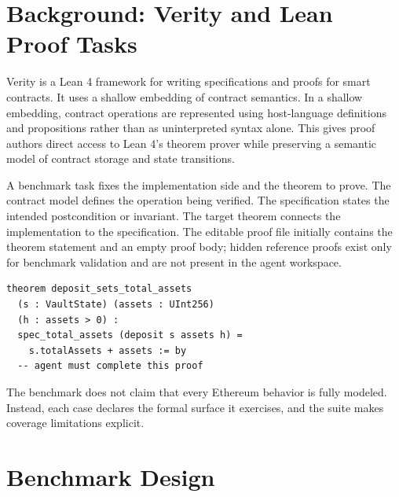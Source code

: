 \documentclass[conference]{IEEEtran}
\newcommand{\lean}{Lean 4}
\begin{document}
\section{Background: Verity and Lean Proof Tasks}

Verity is a \lean{} framework for writing specifications and proofs for smart
contracts. It uses a shallow embedding of contract semantics. In a shallow
embedding, contract operations are represented using host-language definitions
and propositions rather than as uninterpreted syntax alone. This gives proof
authors direct access to \lean{}'s theorem prover while preserving a semantic
model of contract storage and state transitions.

A benchmark task fixes the implementation side and the theorem to prove. The
contract model defines the operation being verified. The specification states
the intended postcondition or invariant. The target theorem connects the
implementation to the specification.
The editable proof file initially contains the theorem statement and an empty
proof body; hidden reference proofs exist only for benchmark validation and are
not present in the agent workspace.

\begin{lstlisting}[caption={Schematic benchmark task shape.},label={lst:task}]
theorem deposit_sets_total_assets
  (s : VaultState) (assets : UInt256)
  (h : assets > 0) :
  spec_total_assets (deposit s assets h) =
    s.totalAssets + assets := by
  -- agent must complete this proof
\end{lstlisting}

The benchmark does not claim that every Ethereum behavior is fully modeled.
Instead, each case declares the formal surface it exercises, and the suite makes
coverage limitations explicit.

\section{Benchmark Design}
\end{document}
